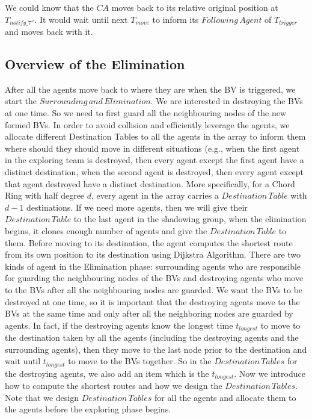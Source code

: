 \documentclass[conference]{IEEEtran}
\begin{document}
We could know that the $CA$ moves back to its relative original position at $T_{notify\_7''}$. It would wait until next $T_{move}$ to inform its $Following\,Agent$ of $T_{trigger}$ and moves back with it.

\subsection{Overview of the Elimination}
After all the agents move back to where they are when the BV is triggered, we start the $Surrounding\,and\,Elimination$. We are interested in destroying the BVs at one time. So we need to first guard all the neighbouring nodes of the new formed BVs. In order to avoid collision and efficiently leverage the agents, we allocate different Destination Tables to all the agents in the array to inform them where should they should move in different situations (e.g., when the first agent in the exploring team is destroyed, then every agent except the first agent have a distinct destination, when the second agent is destroyed, then every agent except that agent destroyed have a distinct destination. More specifically, for a Chord Ring with half degree $d$, every agent in the array carries a $Destination\,Table$ with $d-1$ destinations. If we need more agents, then we will give their $Destination\,Table$ to the last agent in the shadowing group, when the elimination begins, it clones enough number of agents and give the $Destination\, Table$ to them. Before moving to its destination, the agent computes the shortest route from its own position to its destination using Dijkstra Algorithm. There are two kinds of agent in the Elimination phase: surrounding agents who are responsible for guarding the neighbouring nodes of the BVs and destroying agents who move to the BVs after all the neighbouring nodes are guarded. We want the BVs to be destroyed at one time, so it is important that the destroying agents move to the BVs at the same time and only after all the neighboring nodes are guarded by agents. In fact, if the destroying agents know the longest time $t_{longest}$ to move to the destination taken by all the agents (including the destroying agents and the surrounding agents), then they move to the last node prior to the destination and wait until $t_{longest}$ to move to the BVs together. So in the $Destination\,Tables$ for the destroying agents, we also add an item which is the $t_{longest}$. Now we introduce how to compute the shortest routes and how we design the $Destination\,Tables$. Note that we design $Destination\,Tables$ for all the agents and allocate them to the agents before the exploring phase begins.
\end{document}
